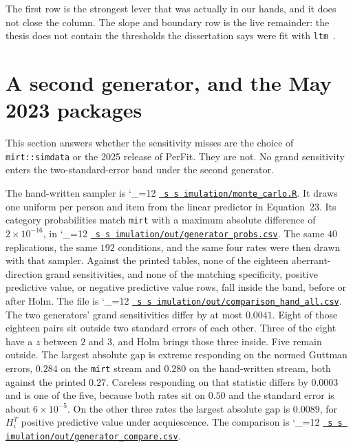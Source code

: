 \documentclass[11pt]{article}
\makeatletter
\newcommand{\proofbase}{https://github.com/alectionary/vibe-math/blob/master/formalization/polytomous-person-fit}
\def\pf@show#1{%
  \ifx\relax#1\else
    #1\allowbreak
    \expandafter\pf@show
  \fi}
\newcommand{\src}{\begingroup\catcode`\_=12 \pf@src}
\newcommand{\pf@src}[1]{%
  \edef\srcurl{\proofbase/#1}%
  \href{\srcurl}{\texttt{\pf@show#1\relax}}\endgroup}
\newcommand{\srcat}{\begingroup\catcode`\_=12 \pf@srcat}
\newcommand{\pf@srcat}[2]{%
  \edef\srcurl{\proofbase/#1\#L#2}%
  \href{\srcurl}{\texttt{\pf@show#1\relax}}\endgroup}
\makeatother
\begin{document}
The first row is the strongest lever that was actually in our hands,
and it does not close the column.
The slope and boundary row is the live remainder: the thesis does not
contain the thresholds the dissertation says were fit with \texttt{ltm}~\cite{rizopoulos2006}.

\section{A second generator, and the May 2023 packages}
\label{sec:two}

This section answers whether the sensitivity misses are the choice of
\texttt{mirt::simdata} or the 2025 release of PerFit.
They are not.
No grand sensitivity enters the two-standard-error band under the
second generator.

The hand-written sampler is
\srcat{simulation/monte_carlo.R}{172}.
It draws one uniform per person and item from the linear predictor in
Equation~23.
Its category probabilities match \texttt{mirt} with a maximum absolute
difference of \(2\times 10^{-16}\), in
\src{simulation/out/generator_probs.csv}.
The same \(40\) replications, the same \(192\) conditions, and the same
four rates were then drawn with that sampler.
Against the printed tables, none of the eighteen aberrant-direction
grand sensitivities, and none of the matching specificity, positive
predictive value, or negative predictive value rows, fall inside the
band, before or after Holm.
The file is \src{simulation/out/comparison_hand_all.csv}.
The two generators' grand sensitivities differ by at most \(0.0041\).
Eight of those eighteen pairs sit outside two standard errors of each
other.
Three of the eight have a \(z\) between \(2\) and \(3\), and Holm brings
those three inside.
Five remain outside.
The largest absolute gap is extreme responding on the normed Guttman
errors, \(0.284\) on the \texttt{mirt} stream and \(0.280\) on the
hand-written stream, both against the printed \(0.27\).
Careless responding on that statistic differs by \(0.0003\) and is one
of the five, because both rates sit on \(0.50\) and the standard error
is about \(6\times 10^{-5}\).
On the other three rates the largest absolute gap is \(0.0089\), for
\(H_i^T\) positive predictive value under acquiescence.
The comparison is \src{simulation/out/generator_compare.csv}.
\end{document}
